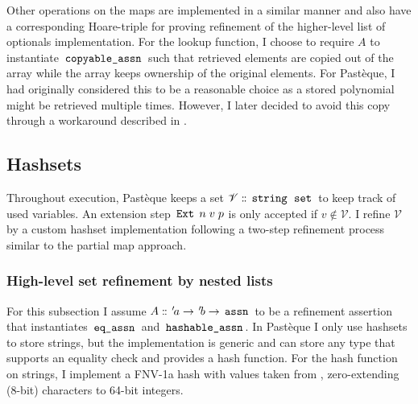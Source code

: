 Other operations on the maps are implemented in a similar manner and also have a corresponding Hoare-triple for proving refinement of the higher-level list of optionals implementation.
For the lookup function, I choose to require $A$ to instantiate $\,\text{\ttfamily copyable\_assn}\,$ such that retrieved elements are copied out of the array while the array keeps ownership of the original elements.
For Pastèque, I had originally considered this to be a reasonable choice as a stored polynomial might be retrieved multiple times.
However, I later decided to avoid this copy through a workaround described in .

\subsection{Hashsets}\label{sec:hashsets}

Throughout execution, Pastèque keeps a set $\mathscr{V} \mathrel{\mathord{:}\mkern-1.2mu\mathord{:}} \,\text{\ttfamily string}\, \; \,\text{\ttfamily set}\,$ to keep track of used variables.
An extension step $\,\text{\ttfamily Ext}\, \; n \; v \; p$ is only accepted if $v \not\in \mathscr{V}$.
I refine $\mathscr{V}$ by a custom hashset implementation following a two-step refinement process similar to the partial map approach.

\subsubsection{High-level set refinement by nested lists}\label{sec:high-level-hashsets}

For this subsection I assume $A \mathrel{\mathord{:}\mkern-1.2mu\mathord{:}} {\mskip2mu '\mskip-2mua} \rightarrow {\mskip2mu '\mskip-2mub} \rightarrow \,\text{\ttfamily assn}\,$ to be a refinement assertion that instantiates $\,\text{\ttfamily eq\_assn}\,$ and $\,\text{\ttfamily hashable\_assn}\,$.
In Pastèque I only use hashsets to store strings, but the implementation is generic and can store any type that supports an equality check and provides a hash function.
For the hash function on strings, I implement a FNV-1a hash with values taken from \cite{noll_fnv}, zero-extending (8-bit) characters to 64-bit integers.

